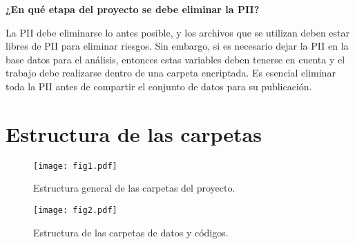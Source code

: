 \documentclass[11pt,en]{elegantpaper}
\begin{document}
\noindent
\textbf{¿En qué etapa del proyecto se debe eliminar la PII?}

La PII debe eliminarse lo antes posible, y los archivos que se utilizan deben estar libres de PII para eliminar riesgos. Sin embargo, si es necesario dejar la PII en la base datos para el análisis, entonces estas variables deben tenerse en cuenta y el trabajo debe realizarse dentro de una carpeta encriptada. Es esencial eliminar toda la PII antes de compartir el conjunto de datos para su publicación.

\newpage 
\appendix 
\section{Estructura de las carpetas}
\label{sec:appendix}
\begin{figure}[htbp]
	\centering
	\caption{Estructura general de las carpetas del proyecto.\label{fig:carpetas}}
	\texttt{[image: fig1.pdf]}
\end{figure}


\begin{figure}[htbp]
	\centering
	\caption{Estructura de las carpetas de datos y códigos. \label{fig:code}}
	\texttt{[image: fig2.pdf]}
\end{figure}

\end{document}
